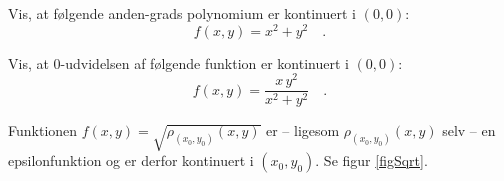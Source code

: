 \begin{exercise}
Vis, at følgende anden-grads polynomium er kontinuert i $(0,0)$:
\begin{equation}
f(x,y) = x^{2} + y^{2} \quad .
\end{equation}
\end{exercise}

\begin{exercise}
Vis, at $0$-udvidelsen af følgende funktion er kontinuert i $(0,0)$:
\begin{equation}
f(x,y) = \frac{x\,y^{2}}{x^{2} + y^{2}} \quad .
\end{equation}
\end{exercise}


\begin{example}
Funktionen $f(x, y) = \sqrt{\rho_{(x_{0}, y_{0})}(x,y)}$ er -- ligesom $\rho_{(x_{0}, y_{0})}(x,y)$ selv -- en epsilonfunktion og er derfor kontinuert i $(x_{0}, y_{0})$. Se figur \ref{figSqrt}.
\end{example}

